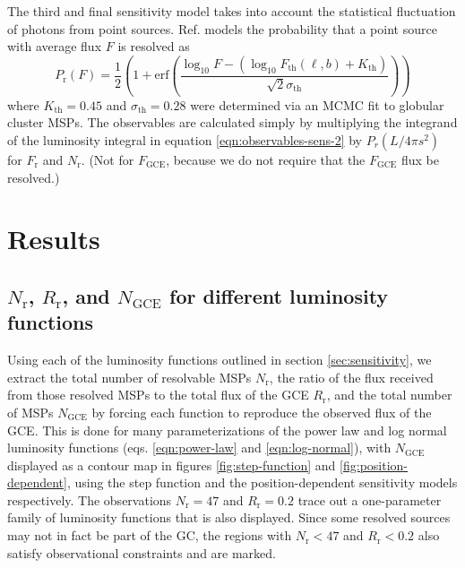 \documentclass[a4paper,11pt]{article}
\newcommand{\parens}[1]{\left(#1\right)}
\newcommand{\comment}[1]{\emph{\color{red}{#1}}}
\begin{document}
The third and final sensitivity model takes into account the statistical fluctuation of photons from point sources. Ref. \cite{Ploeg:2020jeh} models the probability that a point source with average flux $F$ is resolved as
\begin{equation}
    P_\text{r}(F) = \frac{1}{2} \parens{1 + \text{erf} \parens{\frac{\log_{10} F - (\log_{10} F_\text{th}(\ell, b) + K_\text{th})}{\sqrt{2}\sigma_\text{th}}}}
    \label{eqn:ploeg-smoothing}
\end{equation}
where $K_\text{th} = 0.45$ and $\sigma_\text{th} = 0.28$ were determined via an MCMC fit to globular cluster MSPs. The observables are calculated simply by multiplying the integrand of the luminosity integral in equation \ref{eqn:observables-sens-2} by $P_r(L/4\pi s^2)$ for $F_\text{r}$ and $N_\text{r}$. (Not for $F_\text{GCE}$, because we do not require that the $F_\text{GCE}$ flux be resolved.) \comment{Should I mention how much the sensitivity models differ, or wait until the results have been presented?}






\section{Results}
\subsection{$N_\text{r}$, $R_\text{r}$, and $N_\text{GCE}$ for different luminosity functions}
Using each of the luminosity functions outlined in section \ref{sec:sensitivity}, we extract the total number of resolvable MSPs $N_\text{r}$, the ratio of the flux received from those resolved MSPs to the total flux of the GCE $R_\text{r}$, and the total number of MSPs $N_\text{GCE}$ by forcing each function to reproduce the observed flux of the GCE. This is done for many parameterizations of the power law and log normal luminosity functions (eqs. \ref{eqn:power-law} and \ref{eqn:log-normal}), with $N_\text{GCE}$ displayed as a contour map in figures \ref{fig:step-function} and \ref{fig:position-dependent}, using the step function and the position-dependent sensitivity models respectively. The observations $N_\text{r}=47$ and $R_\text{r}=0.2$ trace out a one-parameter family of luminosity functions that is also displayed. Since some resolved sources may not in fact be part of the GC, the regions with $N_\text{r} < 47$ and $R_\text{r} < 0.2$ also satisfy observational constraints and are marked.
\end{document}
